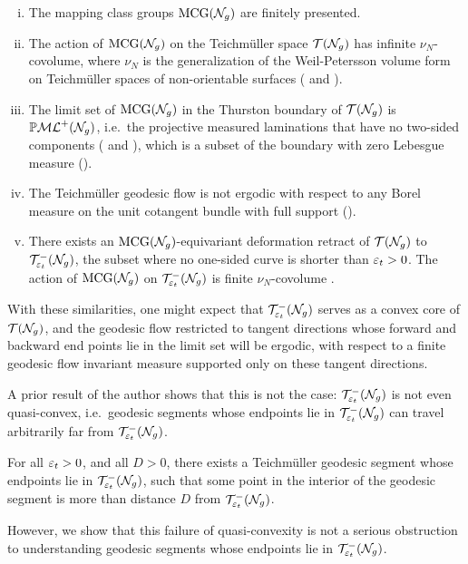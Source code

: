 \begin{enumerate}[(i)]
\item The mapping class groups $\mathrm{MCG}(\mathcal{N}_g)$ are finitely presented.
\item The action of $\mathrm{MCG}(\mathcal{N}_g)$ on the Teichmüller space $\mathcal{T}(\mathcal{N}_g)$ has infinite $\nu_N$-covolume, where $\nu_N$ is the generalization of the Weil-Petersson volume form on Teichmüller spaces of non-orientable surfaces (\cite[Theorem 17.1]{gendulphe2017whats} and \cite{norbury2008lengths}).
\item The limit set of $\mathrm{MCG}(\mathcal{N}_g)$ in the Thurston boundary of $\mathcal{T}(\mathcal{N}_g)$ is $\mathbb{P}\mathcal{ML}^+(\mathcal{N}_g)$, i.e.\ the projective measured laminations that have no two-sided components  (\cite{erlandsson2023mapping} and \cite{limitsetkhan}), which is a subset of the boundary with zero Lebesgue measure (\cite{norbury2008lengths}).
\item The Teichmüller geodesic flow is not ergodic with respect to any Borel measure on the unit cotangent bundle with full support (\cite[Proposition 17.5]{gendulphe2017whats}).
\item There exists an $\mathrm{MCG}(\mathcal{N}_g)$-equivariant deformation retract of $\mathcal{T}(\mathcal{N}_g)$ to $\mathcal{T}_{\varepsilon_t}^{-}(\mathcal{N}_g)$, the subset where no one-sided curve is shorter than $\varepsilon_t > 0$. The action of $\mathrm{MCG}(\mathcal{N}_g)$ on $\mathcal{T}_{\varepsilon_t}^{-}(\mathcal{N}_g)$ is finite $\nu_N$-covolume \cite[Proposition 19.1]{gendulphe2017whats}.
\end{enumerate}

With these similarities, one might expect that $\mathcal{T}_{\varepsilon_t}^{-}(\mathcal{N}_g)$ serves as a convex core of $\mathcal{T}(\mathcal{N}_g)$, and the geodesic flow restricted to tangent directions whose forward and backward end points lie in the limit set will be ergodic, with respect to a finite geodesic flow invariant measure supported only on these tangent directions.

A prior result of the author shows that this is not the case: $\mathcal{T}_{\varepsilon_t}^{-}(\mathcal{N}_g)$ is not even quasi-convex, i.e.\ geodesic segments whose endpoints lie in $\mathcal{T}_{\varepsilon_t}^{-}(\mathcal{N}_g)$ can travel arbitrarily far from $\mathcal{T}_{\varepsilon_t}^{-}(\mathcal{N}_g)$.

\begin{theorem}
  For all $\varepsilon_t > 0$, and all $D > 0$, there exists a Teichmüller geodesic segment whose endpoints lie in $\mathcal{T}_{\varepsilon_t}^{-}(\mathcal{N}_g)$, such that some point in the interior of the geodesic segment is more than distance $D$ from $\mathcal{T}_{\varepsilon_t}^{-}(\mathcal{N}_g)$.
\end{theorem}

However, we show that this failure of quasi-convexity is not a serious obstruction to understanding geodesic segments whose endpoints lie in $\mathcal{T}_{\varepsilon_t}^{-}(\mathcal{N}_g)$.

